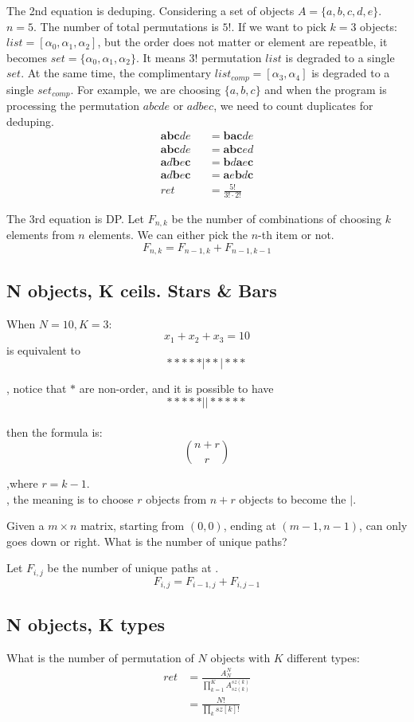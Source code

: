 The 2nd equation is deduping. Considering a set of objects $A = \{a, b, c, d, e\}$. $n = 5$. The number of total permutations is $5!$. If we want to pick $k=3$ objects: $list = [\alpha_0, \alpha_1, \alpha_2]$, but the order does not matter or element are repeatble, it becomes $set = \{\alpha_0, \alpha_1, \alpha_2\}$. It means $3!$ permutation $list$ is degraded to a single $set$. At the same time, the complimentary $list_{comp} = [\alpha_3, \alpha_4]$ is degraded to a single $set_{comp}$. For example, we are choosing $\{a, b, c\}$ and when the program is processing the permutation $abcde$ or $adbec$, we need to count duplicates for deduping. 
\begin{eqnarray*}
\mathbf{abc}de &&= \mathbf{bac}de \\
\mathbf{abc}de && = \mathbf{abc}ed \\
\mathbf{a}d\mathbf{b}e\mathbf{c} &&= \mathbf{b}d\mathbf{a}e\mathbf{c} \\
\mathbf{a}d\mathbf{b}e\mathbf{c} && = \mathbf{a}e\mathbf{b}d\mathbf{c} \\
ret &&= \frac{5!}{3! \cdot 2!}
\end{eqnarray*}

The 3rd equation is DP. Let $F_{n, k}$ be the number of combinations of choosing $k$ elements from $n$ elements. We can either pick the $n$-th item or not. 
$$
F_{n,k} = F_{n-1, k} + F_{n-1, k-1}
$$

\subsection{N objects, K ceils. Stars \& Bars}
When $N=10, K=3$:
$$
x_1 + x_2 + x_3 = 10
$$
is equivalent to
$$
*****|**|***
$$

, notice that $*$ are non-order, and it is possible to have 
$$
*****||*****
$$
\\
then the formula is:
$$
{n+r \choose r}
$$

,where $r=k-1$. 
\\
, the meaning is to choose $r$ objects from $n+r$ objects to become the $|$.

 Given a $m \times n$ matrix, starting from $(0, 0)$, ending at $(m-1, n-1)$, can only goes down or right. What is the number of unique paths?

Let $F_{i, j}$ be the number of unique paths at \pyinline{[i][j]}. 
$$
F_{i, j} = F_{i-1, j} + F_{i, j-1}
$$

\subsection{N objects, K types} \label{N_objects_K_types}
What is the number of permutation of $N$ objects with $K$ different types:
\begin{align*}
ret &= \frac{A_N^N}{\prod_{k=1}^K{A_{sz(k)}^{sz(k)}}} \\
&= \frac{N!}{\prod_{k} sz[k]!}
\end{align*}

